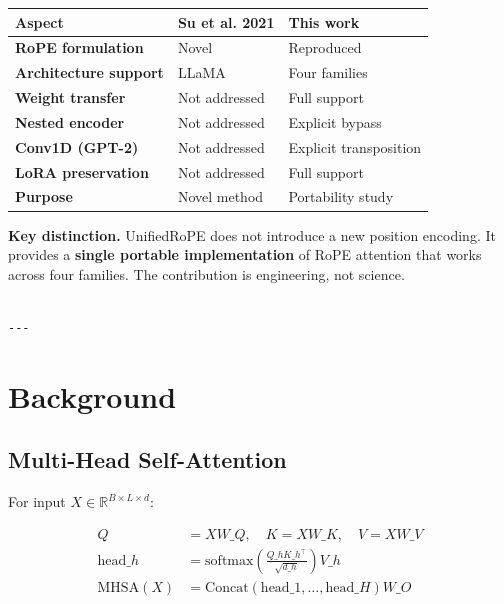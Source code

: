 \begin{table}[H]
\centering
\small
\begin{tabular}{lll}
\toprule
\textbf{Aspect} & \textbf{Su et al. 2021} & \textbf{This work} \\
\midrule
\textbf{RoPE formulation} & Novel & Reproduced \\
\textbf{Architecture support} & LLaMA & Four families \\
\textbf{Weight transfer} & Not addressed & Full support \\
\textbf{Nested encoder} & Not addressed & Explicit bypass \\
\textbf{Conv1D (GPT-2)} & Not addressed & Explicit transposition \\
\textbf{LoRA preservation} & Not addressed & Full support \\
\textbf{Purpose} & Novel method & Portability study \\
\bottomrule
\end{tabular}
\end{table}

\textbf{Key distinction.} UnifiedRoPE does not introduce a new position encoding. 
It provides a \textbf{single portable implementation} of RoPE attention that 
works across four families. The contribution is engineering, not science.
\begin{lstlisting}

---
\end{lstlisting}


\section{Background}

\subsection{Multi-Head Self-Attention}

For input $X \in \mathbb{R}^{B \times L \times d}$:

\[
\begin{aligned}
Q &= X W\_Q, \quad K = X W\_K, \quad V = X W\_V \\
\text{head}\_h &= \mathrm{softmax}\!\left(\frac{Q\_h K\_h^\top}{\sqrt{d\_h}}\right) V\_h \\
\text{MHSA}(X) &= \mathrm{Concat}(\text{head}\_1, \dots, \text{head}\_H) W\_O
\end{aligned}
\tag{3.1}
\]

